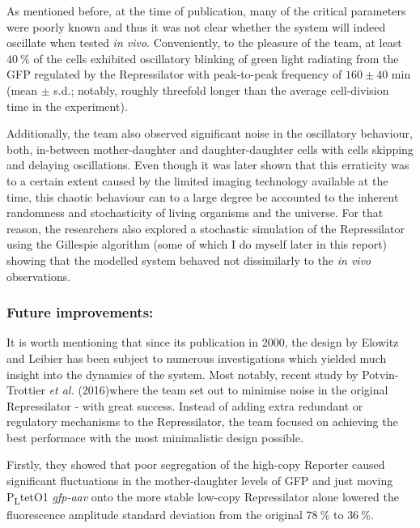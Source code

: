 \documentclass[runningheads,a4paper]{llncs}
\begin{document}
As mentioned before, at the time of publication, many of the critical parameters were poorly known and thus it was not clear whether the system will indeed oscillate when tested \textit{in vivo}. Conveniently, to the pleasure of the team, at least $40\ \%$ of the cells exhibited oscillatory blinking of green light radiating from the GFP regulated by the Repressilator with peak-to-peak frequency of $160 \pm 40$ min (mean $\pm$ s.d.; notably, roughly threefold longer than the average cell-division time in the experiment)\cite{Elowitz2000d}. 

Additionally, the team also observed significant noise in the oscillatory behaviour, both, in-between mother-daughter and daughter-daughter cells with cells skipping and delaying oscillations\cite{Elowitz2000d}. Even though it was later shown that this erraticity was to a certain extent caused by the limited imaging technology available at the time\cite{Potvin-Trottier2016a}, this chaotic behaviour can to a large degree be accounted to the inherent randomness and stochasticity of living organisms and the universe. For that reason, the researchers also explored a stochastic simulation of the Repressilator using the Gillespie algorithm (some of which I do myself later in this report) showing that the modelled system behaved not dissimilarly to the \textit{in vivo} observations\cite{Elowitz2000d}.

\subsubsection*{Future improvements:}
It is worth mentioning that since its publication in 2000, the design by Elowitz and Leibier has been subject to numerous investigations which yielded much insight into the dynamics of the system\cite{Purcell2010a}. Most notably, recent study by Potvin-Trottier \textit{et al.} (2016)\cite{Potvin-Trottier2016a}\linebreak where the team set out to minimise noise in the original Repressilator - with great success. Instead of adding extra redundant or regulatory mechanisms to the Repressilator, the team focused on achieving the best performace with the most minimalistic design possible.

Firstly, they showed that poor segregation of the high-copy Reporter caused significant fluctuations in the mother-daughter levels of GFP and just moving P\textsubscript{L}tetO1 \textit{gfp-aav} onto the more stable low-copy Repressilator alone lowered the fluorescence amplitude standard deviation from the original $78\ \%$ to $36\ \%$\cite{Potvin-Trottier2016a}. 
\end{document}
